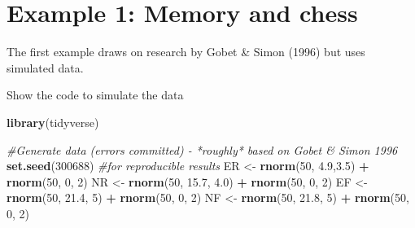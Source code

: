 \documentclass[
]{book}
\newenvironment{Shaded}{\begin{snugshade}}{\end{snugshade}}
\newcommand{\CommentTok}[1]{\textcolor[rgb]{0.56,0.35,0.01}{\textit{#1}}}
\newcommand{\DecValTok}[1]{\textcolor[rgb]{0.00,0.00,0.81}{#1}}
\newcommand{\FloatTok}[1]{\textcolor[rgb]{0.00,0.00,0.81}{#1}}
\newcommand{\KeywordTok}[1]{\textcolor[rgb]{0.13,0.29,0.53}{\textbf{#1}}}
\newcommand{\NormalTok}[1]{#1}
\newcommand{\OperatorTok}[1]{\textcolor[rgb]{0.81,0.36,0.00}{\textbf{#1}}}
\newcommand{\StringTok}[1]{\textcolor[rgb]{0.31,0.60,0.02}{#1}}
\begin{document}
\hypertarget{example-1-memory-and-chess}{%
\section{Example 1: Memory and chess}\label{example-1-memory-and-chess}}

The first example draws on research by Gobet \& Simon (1996) but uses simulated data.

Show the code to simulate the data

\begin{Shaded}
\begin{Highlighting}[]
\KeywordTok{library}\NormalTok{(tidyverse)}

\CommentTok{#Generate data (errors committed) - *roughly* based on Gobet & Simon 1996}
\KeywordTok{set.seed}\NormalTok{(}\DecValTok{300688}\NormalTok{) }\CommentTok{#for reproducible results}
\NormalTok{ER <-}\StringTok{ }\KeywordTok{rnorm}\NormalTok{(}\DecValTok{50}\NormalTok{, }\FloatTok{4.9}\NormalTok{,}\FloatTok{3.5}\NormalTok{) }\OperatorTok{+}\StringTok{ }\KeywordTok{rnorm}\NormalTok{(}\DecValTok{50}\NormalTok{, }\DecValTok{0}\NormalTok{, }\DecValTok{2}\NormalTok{)}
\NormalTok{NR <-}\StringTok{ }\KeywordTok{rnorm}\NormalTok{(}\DecValTok{50}\NormalTok{, }\FloatTok{15.7}\NormalTok{, }\FloatTok{4.0}\NormalTok{) }\OperatorTok{+}\StringTok{ }\KeywordTok{rnorm}\NormalTok{(}\DecValTok{50}\NormalTok{, }\DecValTok{0}\NormalTok{, }\DecValTok{2}\NormalTok{)}
\NormalTok{EF <-}\StringTok{ }\KeywordTok{rnorm}\NormalTok{(}\DecValTok{50}\NormalTok{, }\FloatTok{21.4}\NormalTok{, }\DecValTok{5}\NormalTok{) }\OperatorTok{+}\StringTok{ }\KeywordTok{rnorm}\NormalTok{(}\DecValTok{50}\NormalTok{, }\DecValTok{0}\NormalTok{, }\DecValTok{2}\NormalTok{)}
\NormalTok{NF <-}\StringTok{ }\KeywordTok{rnorm}\NormalTok{(}\DecValTok{50}\NormalTok{, }\FloatTok{21.8}\NormalTok{, }\DecValTok{5}\NormalTok{) }\OperatorTok{+}\StringTok{ }\KeywordTok{rnorm}\NormalTok{(}\DecValTok{50}\NormalTok{, }\DecValTok{0}\NormalTok{, }\DecValTok{2}\NormalTok{)}


\end{Highlighting}
\end{Shaded}
\end{document}
